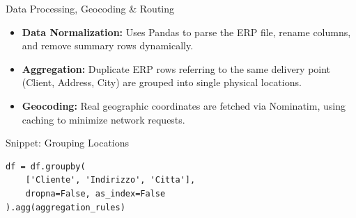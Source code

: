 \begin{frame}[fragile]{Data Processing, Geocoding \& Routing}
\begin{itemize}
    \item \textbf{Data Normalization:} Uses Pandas to parse the ERP file, rename columns, and remove summary rows dynamically.
    \item \textbf{Aggregation:} Duplicate ERP rows referring to the same delivery point (Client, Address, City) are grouped into single physical locations.
    \item \textbf{Geocoding:} Real geographic coordinates are fetched via Nominatim, using caching to minimize network requests.
\end{itemize}

\begin{block}{Snippet: Grouping Locations}
\begin{verbatim}
df = df.groupby(
    ['Cliente', 'Indirizzo', 'Citta'],
    dropna=False, as_index=False
).agg(aggregation_rules)
\end{verbatim}
\end{block}
\end{frame}
